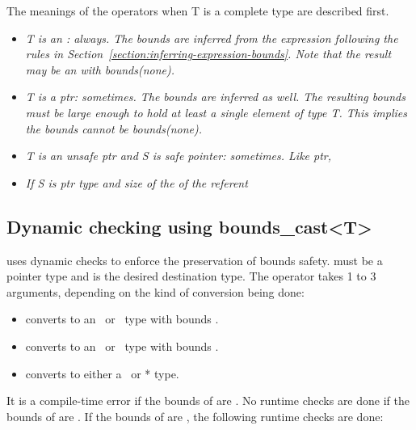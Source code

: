 The meanings of the operators when T is a complete type are described
first.

\begin{quote}
\end{quote}

\begin{itemize}
\item
  \it{T is an \arrayptr: always. The bounds are inferred from the
  expression following the rules in Section~\ref{section:inferring-expression-bounds}.
   Note that the result may
  be an \arrayptr with bounds(none).}
\item
  \it{T is a ptr: sometimes. The bounds are inferred as well. The
  resulting bounds must be large enough to hold at least a single
  element of type T. This implies the bounds cannot be bounds(none).}
\item
  \it{T is an unsafe ptr and S is safe pointer: sometimes. Like ptr, }
    \item
    \it{If S is ptr type and size of the of the referent }
\end{itemize}

\subsection{Dynamic checking using bounds\_cast\textless{}T\textgreater{}}

 uses
dynamic checks to enforce the preservation of bounds safety. 
must be a pointer type and is the desired destination type. The operator
takes 1 to 3 arguments, depending on the kind of conversion being done:

\begin{itemize}
\item
   converts  to an \arrayptr\ or
  \arrayview\ type with bounds .
\item
   converts  to an
  \arrayptr\ or \arrayview\ type with bounds
  .
\item
  converts  to either a \ptr\ or * type.
\end{itemize}

It is a compile-time error if the bounds of  are
\boundsnone. No runtime checks are done if the bounds of 
are \boundsany. If the bounds of  are
, the following
runtime checks are done:

